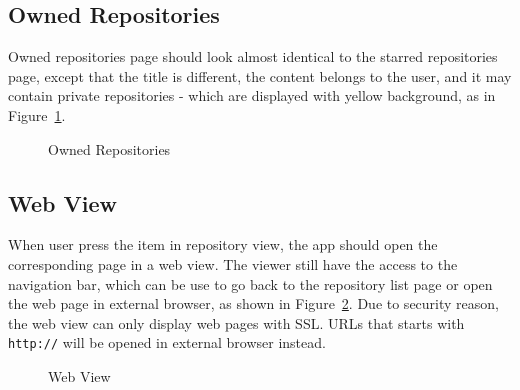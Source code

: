 \documentclass[12pt]{article}
\newcommand{\imgh}[4]{
    \begin{figure}[!htbp]%
    \begin{center}
    \subfloat{{\texttt{[image: \#2]} }}%
    \qquad
    \subfloat{{\texttt{[image: \#3]} }}%
    \caption{#4}\label{#2}
    \end{center}
\end{figure}
}
\begin{document}
\subsection{Owned Repositories}

Owned repositories page should look almost identical to the starred repositories page, except that the title is different, the content belongs to the user, and it may contain private repositories - which are displayed with yellow background, as in Figure~\ref{owned_repositories}.

\imgh{0.45}{owned_repositories}{owned_repositories_iphoneX}{Owned Repositories}

\subsection{Web View}

When user press the item in repository view, the app should open the corresponding page in a web view. The viewer still have the access to the navigation bar, which can be use to go back to the repository list page or open the web page in external browser, as shown in Figure~\ref{webview}. Due to security reason, the web view can only display web pages with SSL. URLs that starts with \texttt{http://} will be opened in external browser instead.

\imgh{0.45}{webview}{webview_iphoneX}{Web View}
\end{document}
